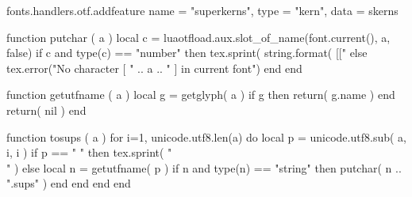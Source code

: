 \begin{luacode}
fonts.handlers.otf.addfeature {
 name = "superkerns",
 type = "kern",
 data = skerns
}

function putchar ( a )
 local c = luaotfload.aux.slot_of_name(font.current(), a, false)
 if c and type(c) == "number" then
  tex.sprint( string.format( [[\char"%
 else
  tex.error("No character [ " .. a .. " ] in current font")
 end
end

function getutfname ( a )
 local g = getglyph( a )
 if g then
      return( g.name )
 end
return( nil )
end

function tosups ( a )
 for i=1, unicode.utf8.len(a) do
  local p = unicode.utf8.sub( a, i, i )
  if p == " " then
   tex.sprint( "\\ " )
  else
   local n = getutfname( p )
   if n and type(n) == "string" then
    putchar( n .. ".sups" )
   end
  end
 end
end

\end{luacode}

\def\realsuper#1{{\directlua{tosups("#1")}}}

\setmainfont[Ligatures=TeX,
Path=./fonts/,
UprightFeatures={RawFeature=+superkerns},
BoldFont=EBGaramond-SemiBold.ttf,
ItalicFont=EBGaramond08-Italic.ttf,
BoldItalicFont=EBGaramond-SemiBoldItalic.ttf,
SlantedFont=EBGaramond08-Italic.ttf,
BoldSlantedFont=EBGaramond-SemiBoldItalic.ttf,
UprightFont=ECGaramond08-Regular.ttf]{ECGaramond08-Regular}

\newenvironment{allsc}{%
  \normalfont%
  \addfontfeatures{RawFeature=+u2sc}%
  \scshape%
}{}

\linespread{1}

\newenvironment{vplace}{
  \vspace*{\stretch{1}}
}{
  \vspace{\stretch{1}}
}

\def\scupcase{\normalfont\addfontfeatures{RawFeature=+u2sc}\scshape }
\def\altnumber{\addfontfeatures{Numbers={Proportional,Lining}} }

\newlength{\THINKERN}
\setlength{\THINKERN}{0.16667em}
\DeclareRobustCommand{\thinskip}{\hskip 0.16667em\relax}
\DeclareRobustCommand{\thinkern}{\kern 0.16667em\relax}

\DeclareRobustCommand{\tinyskip}{\hskip 0.1em\relax}
\DeclareRobustCommand{\tinykern}{\kern 0.1em\relax}

\def\emdash{\unskip—\allowbreak\ignorespaces}

